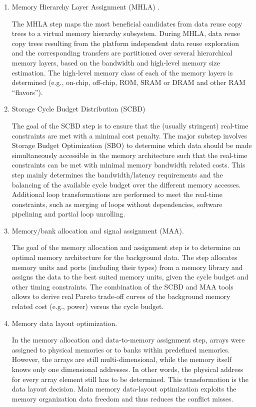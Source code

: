 \begin{enumerate}

\item Memory Hierarchy Layer Assignment (MHLA) .

The MHLA step maps the most beneficial candidates from data reuse copy trees to a virtual memory hierarchy subsystem. 
During MHLA, data reuse copy trees resulting from the platform independent data reuse exploration and the corresponding transfers are partitioned over several hierarchical memory layers, based on the bandwidth and high-level memory size estimation. 
The high-level memory class of each of the memory layers is determined (e.g., on-chip, off-chip, ROM, SRAM or DRAM and other RAM “flavors”). 


\item Storage Cycle Budget Distribution (SCBD) 

The goal of the SCBD step is to ensure that the (usually stringent) real-time constraints are met with a minimal cost penalty. 
The major substep involves Storage Budget Optimization (SBO) to determine which data should be made simultaneously accessible in the memory architecture such that the real-time constraints can be met with minimal memory bandwidth related costs.
This step mainly determines the bandwidth/latency requirements and the balancing of the available cycle budget over the different memory accesses.
Additional loop transformations are performed to meet the real-time constraints, such as merging of loops without dependencies, software pipelining and partial loop unrolling. 

\item Memory/bank allocation and signal assignment (MAA).

The goal of the memory allocation and assignment step is to determine an optimal memory architecture for the background data. 
The step allocates memory units and ports (including their types) from a memory library and assigns the data to the best suited memory units, given the cycle budget and other timing constraints. 
The combination of the SCBD and MAA tools allows to derive real Pareto trade-off curves of the background memory related cost (e.g., power) versus the cycle budget.

\item Memory data layout optimization.

In the memory allocation and data-to-memory assignment step, arrays were assigned to physical memories or to banks within predefined memories. 
However, the arrays are still multi-dimensional, while the memory itself knows only one dimensional addresses. 
In other words, the physical address for every array element still has to be determined. 
This transformation is the data layout decision.
 Main memory data-layout optimization exploits the memory organization data freedom and thus reduces the conflict misses.

\end{enumerate}

